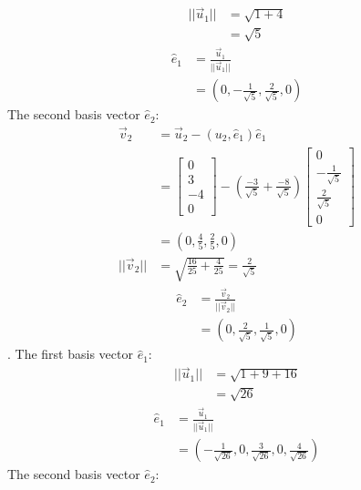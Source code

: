 \documentclass[11pt]{homework}
\begin{document}
\begin{align*}
||\vec u_1|| &= \sqrt{1 + 4} \\
             &= \sqrt{5}
\end{align*}
\begin{align*}
\hat{e}_1 &= \frac{\vec u_1}{||\vec u_1||} \\
          &= (0, -\frac{1}{\sqrt{5}}, \frac{2}{\sqrt{5}}, 0) 
\end{align*}
The second basis vector $\hat{e}_2$:
\begin{align*}
\vec v_2 &= \vec u_2 - (u_2, \hat{e}_1) \hat{e}_1 \\
         &= \begin{bmatrix}
             0 \\   
             3 \\   
            -4 \\  
             0
            \end{bmatrix}
            - (\frac{-3}{\sqrt{5}} + \frac{-8}{\sqrt{5}})
            \begin{bmatrix}
            0 \\ 
            -\frac{1}{\sqrt{5}} \\ 
            \frac{2}{\sqrt{5}} \\
            0
            \end{bmatrix} \\
         &= (0, \frac{4}{5}, \frac{2}{5}, 0) \\
||\vec v_2|| &= \sqrt{\frac{16}{25} + \frac{4}{25}} = \frac{2}{\sqrt{5}}
\end{align*}
\begin{align*}
\hat{e}_2 &= \frac{\vec v_2}{||\vec v_2||} \\
          &= (0, \frac{2}{\sqrt{5}}, \frac{1}{\sqrt{5}}, 0)
\end{align*}
. The first basis vector $\hat{e}_1$:
\begin{align*}
||\vec u_1|| &= \sqrt{1 + 9 + 16} \\
             &= \sqrt{26}
\end{align*}
\begin{align*}
\hat{e}_1 &= \frac{\vec u_1}{||\vec u_1||} \\
          &= (-\frac{1}{\sqrt{26}}, 0, \frac{3}{\sqrt{26}}, 0, \frac{4}{\sqrt{26}} ) 
\end{align*}
The second basis vector $\hat{e}_2$:
\end{document}

